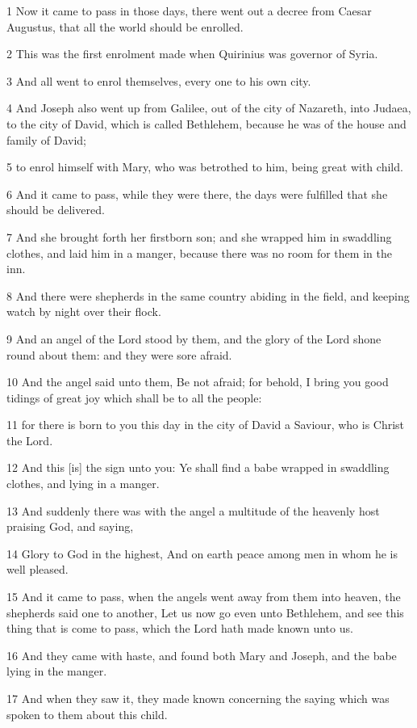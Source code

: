 \par 1 Now it came to pass in those days, there went out a decree from Caesar Augustus, that all the world should be enrolled.
\par 2 This was the first enrolment made when Quirinius was governor of Syria.
\par 3 And all went to enrol themselves, every one to his own city.
\par 4 And Joseph also went up from Galilee, out of the city of Nazareth, into Judaea, to the city of David, which is called Bethlehem, because he was of the house and family of David;
\par 5 to enrol himself with Mary, who was betrothed to him, being great with child.
\par 6 And it came to pass, while they were there, the days were fulfilled that she should be delivered.
\par 7 And she brought forth her firstborn son; and she wrapped him in swaddling clothes, and laid him in a manger, because there was no room for them in the inn.
\par 8 And there were shepherds in the same country abiding in the field, and keeping watch by night over their flock.
\par 9 And an angel of the Lord stood by them, and the glory of the Lord shone round about them: and they were sore afraid.
\par 10 And the angel said unto them, Be not afraid; for behold, I bring you good tidings of great joy which shall be to all the people:
\par 11 for there is born to you this day in the city of David a Saviour, who is Christ the Lord.
\par 12 And this [is] the sign unto you: Ye shall find a babe wrapped in swaddling clothes, and lying in a manger.
\par 13 And suddenly there was with the angel a multitude of the heavenly host praising God, and saying,
\par 14 Glory to God in the highest, And on earth peace among men in whom he is well pleased.
\par 15 And it came to pass, when the angels went away from them into heaven, the shepherds said one to another, Let us now go even unto Bethlehem, and see this thing that is come to pass, which the Lord hath made known unto us.
\par 16 And they came with haste, and found both Mary and Joseph, and the babe lying in the manger.
\par 17 And when they saw it, they made known concerning the saying which was spoken to them about this child.
